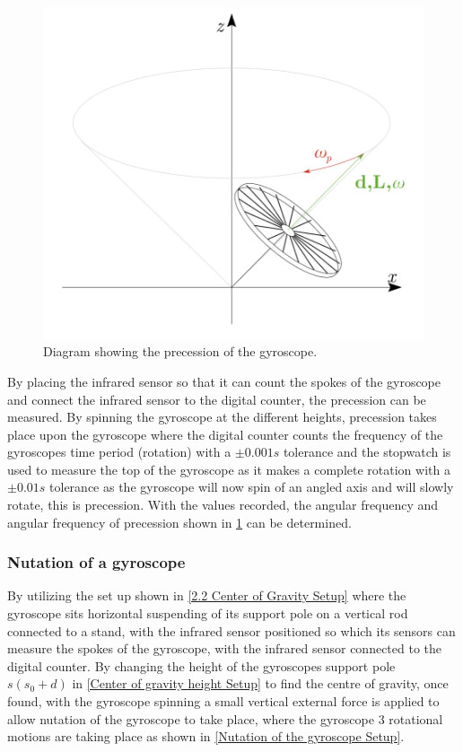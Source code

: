 \documentclass[12pt]{article}
\begin{document}
\begin{figure}[H]
\centering
\includegraphics[scale=0.5]{Images/Labscript/Gyroscope_Precession.png}
\caption{Diagram showing the precession of the gyroscope. \cite{Exp.4-2019}}
\label{Precession of the gyroscope Setup}
\end{figure} 

By placing the infrared sensor so that it can count the spokes of the gyroscope and connect the infrared sensor to the digital counter, the precession can be measured. By spinning the gyroscope at the different heights, precession takes place upon the gyroscope where the digital counter counts the frequency of the gyroscopes time period (rotation) with a $\pm0.001s$ tolerance and the stopwatch is used to measure the top of the gyroscope as it makes a complete rotation with a $\pm0.01s$ tolerance as the gyroscope will now spin of an angled axis and will slowly rotate, this is precession. With the values recorded, the angular frequency and angular frequency of precession shown in \cref{Precession of the gyroscope Setup} can be determined. \\

\subsubsection{Nutation of a gyroscope}
\label{Nutation of a gyroscope method}

By utilizing the set up shown in \cref{2.2 Center of Gravity Setup} where the gyroscope sits horizontal suspending of its support pole on a vertical rod connected to a stand, with the infrared sensor positioned so which its sensors can measure the spokes of the gyroscope, with the infrared sensor connected to the digital counter. By changing the height of the gyroscopes support pole $s (s_0+d)$ in \cref{Center of gravity height Setup} to find the centre of gravity, once found, with the gyroscope spinning a small vertical external force is applied to allow nutation of the gyroscope to take place, where the gyroscope 3 rotational motions are taking place as shown in \cref{Nutation of the gyroscope Setup}. \\
\end{document}

